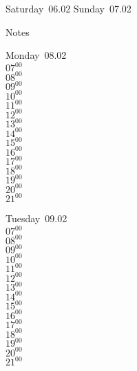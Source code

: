 \documentclass[11pt,a4paper]{book}\usepackage[]{graphicx}\usepackage[]{color}
\begin{document}
\begin{weekendbox}
  Saturday~06.02
  \tcblower
  Sunday~07.02
\end{weekendbox} %
\begin{notebox}
  Notes
\end{notebox}
\clearpage
\begin{headerbox}
\end{headerbox}
\begin{weekdaybox}
  Monday~08.02\\
  { 
  \vfill
  $07^{00}$\\
$08^{00}$\\
$09^{00}$\\
$10^{00}$\\
$11^{00}$\\
$12^{00}$\\
$13^{00}$\\
$14^{00}$\\
$15^{00}$\\
$16^{00}$\\
$17^{00}$\\
$18^{00}$\\
$19^{00}$\\
$20^{00}$\\
$21^{00}$\\
  }
\end{weekdaybox}
\begin{weekdaybox}
  Tuesday~09.02\\
  { 
  \vfill
  $07^{00}$\\
$08^{00}$\\
$09^{00}$\\
$10^{00}$\\
$11^{00}$\\
$12^{00}$\\
$13^{00}$\\
$14^{00}$\\
$15^{00}$\\
$16^{00}$\\
$17^{00}$\\
$18^{00}$\\
$19^{00}$\\
$20^{00}$\\
$21^{00}$\\
  }
\end{weekdaybox}
\end{document}
